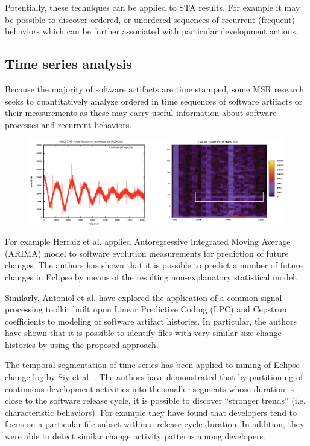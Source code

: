 Potentially, these techniques can be applied to STA results. For example it may be possible to discover ordered, or
unordered sequences of recurrent (frequent) behaviors which can be further associated with particular development actions.

\subsection{Time series analysis}\label{chapter2_section-tsanalysis}
Because the majority of software artifacts are time stamped, some MSR research seeks to quantitatively analyze ordered 
in time sequences of software artifacts or their measurements as these may carry useful information about software 
processes and recurrent behaviors. 

\begin{figure}[t!]
   \centering
   \includegraphics[width=145mm]{figures/FourrierMySQL.eps}
   \caption{}
   \label{fig:mysql-fourrier}
\end{figure}

For example Herraiz et al. \cite{citeulike:6544685} applied Autoregressive Integrated Moving Average (ARIMA) model 
to software evolution measurements for prediction of future changes. The authors has shown that it is possible to 
predict a number of future changes in Eclipse by means of the resulting non-explanatory statistical model. 

Similarly, Antoniol et al. \cite{citeulike:3378725} have explored the application of a common signal processing toolkit 
built upon Linear Predictive Coding (LPC) and Cepstrum coefficients to modeling of software artifact histories. 
In particular, the authors have shown that it is possible to identify files with very similar size change histories 
by using the proposed approach.

The temporal segmentation of time series has been applied to mining of Eclipse change log by Siy et al. \cite{citeulike:10896305}.
The authors have demonstrated that by partitioning of continuous development activities into the smaller segments whose duration 
is close to the software release cycle, it is possible to discover ``stronger trends'' (i.e. characteristic behaviors). 
For example they have found that developers tend to focus on a particular file subset within a release cycle duration. 
In addition, they were able to detect similar change activity patterns among developers.


